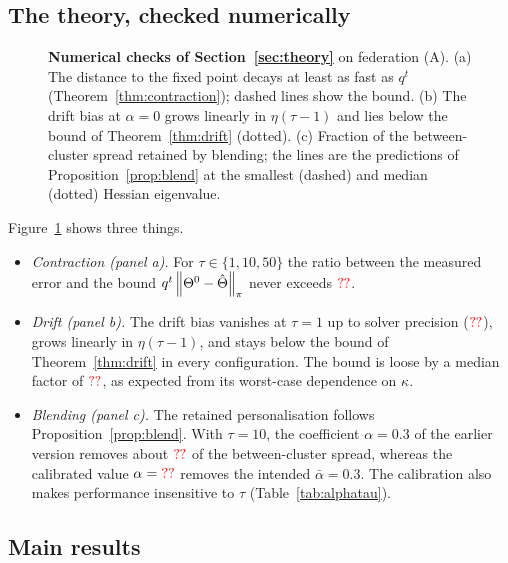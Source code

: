 \subsection{The theory, checked numerically}
\label{sec:e_theory}

\begin{figure}[t]
\centering
{}
\caption{\textbf{Numerical checks of Section~\ref{sec:theory}} on federation (A).
(a) The distance to the fixed point decays at least as fast as $q^t$
(Theorem~\ref{thm:contraction}); dashed lines show the bound.
(b) The drift bias at $\alpha=0$ grows linearly in $\eta(\tau-1)$ and lies below the bound of
Theorem~\ref{thm:drift} (dotted).
(c) Fraction of the between-cluster spread retained by blending; the lines are the
predictions of Proposition~\ref{prop:blend} at the smallest (dashed) and median (dotted)
Hessian eigenvalue.}
\label{fig:theory}
\end{figure}

Figure~\ref{fig:theory} shows three things.
\begin{itemize}[leftmargin=1.2em,itemsep=2pt]
  \item \emph{Contraction (panel a).} For $\tau\in\{1,10,50\}$ the ratio between the
    measured error and the bound $q^t\left\lVert \Theta^0-\hat\Theta \right\rVert_{\pi}$ never exceeds
    $\textcolor{red}{??}$.
  \item \emph{Drift (panel b).} The drift bias vanishes at $\tau=1$ up to solver precision
    ($\textcolor{red}{??}$), grows linearly in $\eta(\tau-1)$, and stays below the bound of
    Theorem~\ref{thm:drift} in every configuration. The bound is loose by a median factor of
    $\textcolor{red}{??}$, as expected from its worst-case dependence on $\kappa$.
  \item \emph{Blending (panel c).} The retained personalisation follows
    Proposition~\ref{prop:blend}. With $\tau=10$, the coefficient $\alpha=0.3$ of the
    earlier version removes about $\textcolor{red}{??}$ of the between-cluster spread, whereas
    the calibrated value $\alpha=\textcolor{red}{??}$ removes the intended $\bar\alpha=0.3$. The
    calibration also makes performance insensitive to $\tau$ (Table~\ref{tab:alphatau}).
\end{itemize}

\subsection{Main results}
\label{sec:e_main}

\begin{table}[t]
\centering\small
\caption{\textbf{Personalised performance of honest clients} (mean $\pm$ std over
$\NumSeeds$ seeds; lower log-loss and higher AUC are better). Bold marks the best deployable
method. $^{+}$/$^{-}$: significantly worse/better than \ptopofl\ (paired Wilcoxon, Holm,
$0.05$). $^\diamond$: non-deployable references with the same clustered training as
\ptopofl.}
\label{tab:main}
\end{table}

